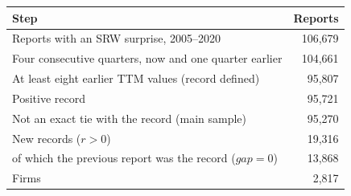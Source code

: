 \begin{tabular}{lr}
\toprule
Step & Reports\\
\midrule
Reports with an SRW surprise, 2005--2020 & 106,679\\
Four consecutive quarters, now and one quarter earlier & 104,661\\
At least eight earlier TTM values (record defined) & 95,807\\
Positive record & 95,721\\
Not an exact tie with the record (main sample) & 95,270\\
\midrule
New records ($r>0$) & 19,316\\
\quad of which the previous report was the record ($gap=0$) & 13,868\\
Firms & 2,817\\
\bottomrule
\end{tabular}

